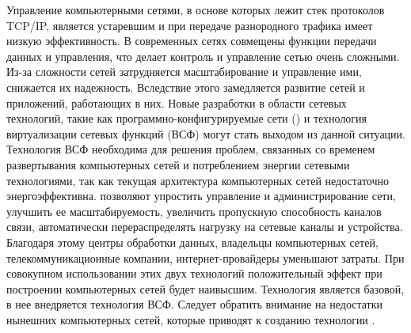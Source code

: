\documentclass[bachelor, och, coursework]{SCWorks}
\begin{document}

\graphicspath{{./images/}}

\tableofcontents

\printglossary

\intro
Управление компьютерными сетями, в основе которых лежит стек протоколов TCP/IP, является устаревшим и при передаче разнородного трафика имеет низкую эффективность. В современных сетях совмещены функции передачи данных и управления, что делает контроль и управление сетью очень сложными. Из-за сложности сетей затрудняется масштабирование и управление ими, снижается их надежность. Вследствие этого замедляется развитие сетей и приложений, работающих в них.
Новые разработки в области сетевых технологий, такие как программно-конфигурируемые сети () и технология виртуализации сетевых функций (ВСФ) могут стать выходом из данной ситуации. Технология ВСФ необходима для решения проблем, связанных со временем развертывания компьютерных сетей и потреблением энергии сетевыми технологиями, так как текущая архитектура компьютерных сетей недостаточно энергоэффективна.  позволяют упростить управление и администрирование сети, улучшить ее масштабируемость, увеличить пропускную способность каналов связи, автоматически перераспределять нагрузку на сетевые каналы и устройства. Благодаря этому центры обработки данных, владельцы компьютерных сетей, телекоммуникационные компании, интернет-провайдеры уменьшают затраты. При совокупном использовании этих двух технологий положительный эффект при построении компьютерных сетей будет наивысшим. Технология  является базовой, в нее внедряется технология ВСФ.
Следует обратить внимание на недостатки нынешних компьютерных сетей, которые приводят к созданию технологии .
\end{document}
